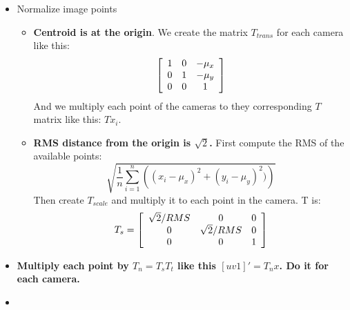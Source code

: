 \documentclass[a4paper,12pt]{article}
\begin{document}
	
\begin{itemize}
    \item Normalize image points
        \begin{itemize}
            \item \textbf{Centroid is at the origin}. We create the matrix $T_{trans}$ for each
                camera like this:
                \begin{equation}
                    \left [
                    \begin{array}[ ]{c c c}
                        1 & 0 & -\mu_x\\
                        0 & 1 & -\mu_y\\
                        0 & 0 & 1\\
                    \end{array}
                \right ]
                \end{equation}
                And we multiply each point of the cameras to they corresponding $T$ matrix like this:
                $Tx_i$.
            \item \textbf{RMS distance from the origin is $\sqrt{2}$.} First compute the RMS of the
                available points:
                \begin{equation}
                    \sqrt{ \frac{1}{n} \sum_{i=1}^n \left(  (x_i - \mu_x)^2 + (y_i- \mu_y)^2) \right) }
                \end{equation}
                Then create $T_{scale}$ and multiply it to each point in the camera. T is:
                \begin{equation}
                    T_s = \left[ 
                    \begin{array}[]{ccc}
                        \sqrt{2}/RMS & 0 & 0 \\
                        0 & \sqrt{2}/RMS  & 0 \\
                        0 & 0 & 1 
                    \end{array}
                     \right]
                \end{equation}
        \end{itemize}
    \item \textbf{Multiply each point by $T_n = T_sT_t$ like this $[u v 1]' = T_nx$. Do it for each camera.}
    \item 
\end{itemize}
\end{document}
